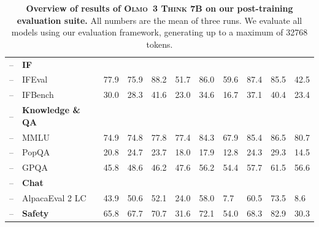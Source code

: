\documentclass[table]{ai2style/ai2}
\newcommand{\metric}[1]{\hspace{0.7em}#1}
\newcommand{\olmothreethinking}{\textsc{Olmo~3 Think}\xspace}
\begin{document}
\begin{table}[t]
{{\begin{NiceTabular}{@{}Hl
C{35pt}C{35pt}P{35pt}|
C{35pt}C{35pt}C{35pt}C{35pt}C{35pt}C{35pt}@{}}
 -- & \textbf{IF} & & & & & & & & & \\
 -- & \metric{IFEval} & 77.9 & 75.9 & 88.2 & 51.7 & 86.0 & 59.6 & 87.4 & 85.5 & 42.5 \\
 -- & \metric{IFBench} & 30.0 & 28.3 & 41.6 & 23.0 & 34.6 & 16.7 & 37.1 & 40.4 & 23.4 \\
\midrule

 -- & \textbf{Knowledge \& QA} & & & & & & & & & \\
 -- & \metric{MMLU} & 74.9 & 74.8 & 77.8 & 77.4 & 84.3 & 67.9 & 85.4 & 86.5 & 80.7 \\
 -- & \metric{PopQA} & 20.8 & 24.7 & 23.7 & 18.0 & 17.9 & 12.8 & 24.3 & 29.3 & 14.5 \\
 -- & \metric{GPQA} & 45.8 & 48.6 & 46.2 & 47.6 & 56.2 & 54.4 & 57.7 & 61.5 & 56.6 \\
\midrule

 -- & \textbf{Chat} & & & & & & & & & \\
 -- & \metric{AlpacaEval 2 LC} & 43.9 & 50.6 & 52.1 & 24.0 & 58.0 & 7.7 & 60.5 & 73.5 & 8.6 \\
\midrule

 -- & \textbf{Safety} & 65.8 & 67.7 & 70.7 & 31.6 & 72.1 & 54.0 & 68.3 & 82.9 & 30.3 \\
\bottomrule

\end{NiceTabular}}}
\caption{\textbf{Overview of results of \textbf{\olmothreethinking 7B} on our post-training evaluation suite.} All numbers are the mean of three runs. We evaluate all models using our evaluation framework, generating up to a maximum of 32768 tokens.}
\label{tab:post-train-eval-overview}
\end{table}
\end{document}
